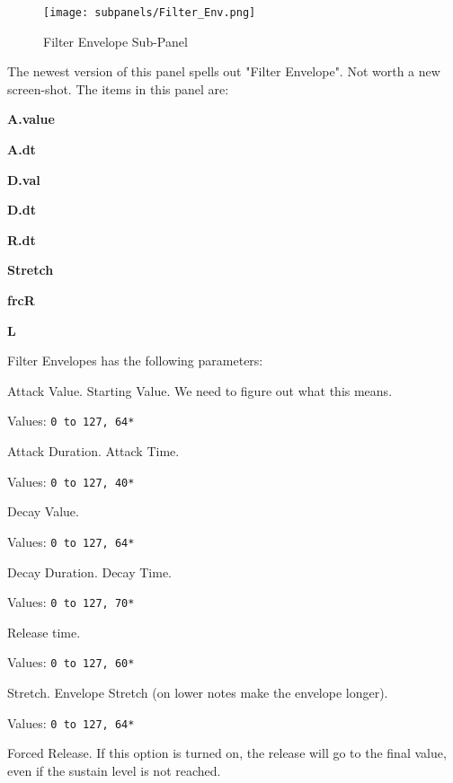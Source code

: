\begin{figure}[H]
   \centering
   \texttt{[image: subpanels/Filter\_Env.png]}
   \caption[Filter Envelope Sub-Panel]{Filter Envelope Sub-Panel}
   \label{fig:filter_env}
\end{figure}

   The newest version of this panel spells out "Filter Envelope".
   Not worth a new screen-shot.
   The items in this panel are:

   \begin{enumber}
      \item \textbf{A.value}
      \item \textbf{A.dt}
      \item \textbf{D.val}
      \item \textbf{D.dt}
      \item \textbf{R.dt}
      \item \textbf{Stretch}
      \item \textbf{frcR}
      \item \textbf{L}
   \end{enumber}

   Filter Envelopes has the following parameters:

   \setcounter{ItemCounter}{0}      %

   Attack Value.  Starting Value.
   We need to figure out what this means.

   Values: \texttt{0 to 127, 64*}

   Attack Duration.  Attack Time.

   Values: \texttt{0 to 127, 40*}

   Decay Value.

   Values: \texttt{0 to 127, 64*}

   Decay Duration.  Decay Time.

   Values: \texttt{0 to 127, 70*}

   Release time.

   Values: \texttt{0 to 127, 60*}

   Stretch.
   Envelope Stretch (on lower notes make the envelope longer).

   Values: \texttt{0 to 127, 64*}

   Forced Release.
   If this option is turned on, the release will go to the
   final value, even if the sustain level is not reached.


